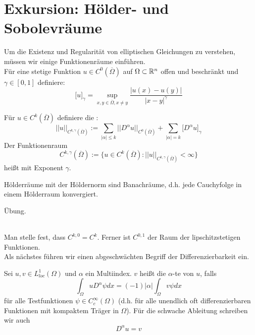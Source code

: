 \section{Exkursion: Hölder- und Sobolevräume}
\label{sec:para8}
	Um die Existenz und Regularität von elliptischen Gleichungen zu verstehen, müssen wir einige Funktionenräume einführen. \\
	Für eine stetige Funktion $u \in C^0(\overline{\Omega})$ auf $\Omega \subset \mathbb{R}^n$ offen und beschränkt und $\gamma \in [0,1]$ definiere:
	\[ \lbrack u \rbrack_\gamma = \sup_{x,y \in \overline{\Omega}, x \neq y} \frac{|u(x)-u(y)|}{|x-y|^\gamma} \]
	
\begin{defn}[Hölderraum] \label{def_51} \label{hoelderraum}
	Für $u \in C^k(\overline{\Omega})$ definiere die : \marginnote{[51]}
	\[ ||u||_{C^{k,\gamma}(\overline{\Omega})} := \sum_{|\alpha| \leq k} ||D^\alpha u||_{C^0(\overline{\Omega})} + \sum_{|\alpha| = k} \lbrack D^\alpha u \rbrack_\gamma \]
	Der Funktionenraum
	\[ C^{k,\gamma}(\overline{\Omega}) := \{ u \in C^k(\overline{\Omega}) : ||u||_{C^{k,\gamma}(\overline{\Omega})} < \infty \} \]
	heißt  mit Exponent $\gamma$.
\end{defn}
	
\begin{thm} \label{thm_52}
	Hölderräume mit der Höldernorm sind Banachräume, d.h. jede Cauchyfolge in einem Hölderraum konvergiert. \marginnote{[52]}
\end{thm}
	
	Übung.
	
\mbox{} \\
Man stelle fest, dass $C^{k,0} = C^k$. Ferner ist $C^{0,1}$ der Raum der lipschitzstetigen Funktionen. \\
Als nächstes führen wir einen abgeschwächten Begriff der Differenzierbarkeit ein.

\begin{defn} \label{def:schwache_abl} \label{def_53}
	Sei $u, v \in L^1_{loc}(\Omega)$ und $\alpha$ ein Multiindex. $v$ heißt die $\alpha$-te  von $u$, falls \marginnote{[53]}
	\begin{equation}
		\int_{\Omega} uD^\alpha \psi dx = (-1) |\alpha| \int_{\Omega} v \psi dx \label{eq_28}
	\end{equation}
	für alle Testfunktionen $\psi \in C_c^\infty(\Omega)$ (d.h. für alle unendlich oft differenzierbaren Funktionen mit kompaktem Träger in $\Omega$). Für die schwache Ableitung schreiben wir auch
	\[ D^\alpha u = v \]
\end{defn}

